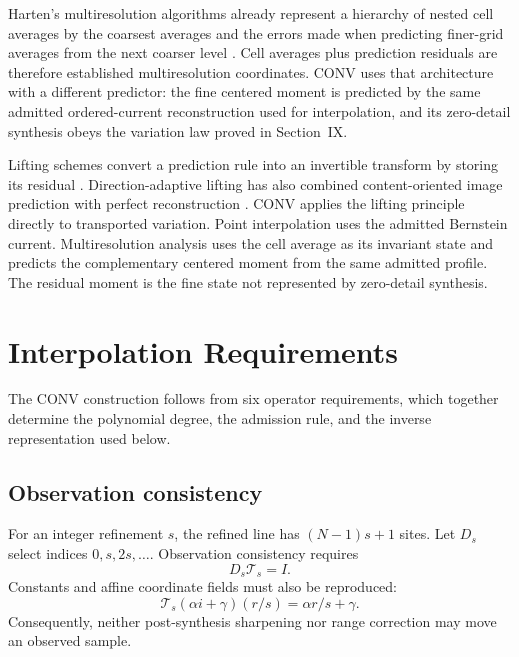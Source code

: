 \documentclass[journal]{IEEEtran}
\newcommand{\Tcal}{\mathcal{T}}
\begin{document}
Harten's multiresolution algorithms already represent a hierarchy of nested
cell averages by the coarsest averages and the errors made when predicting
finer-grid averages from the next coarser level \cite{harten1995}. Cell
averages plus prediction residuals are therefore established multiresolution
coordinates. CONV uses that architecture with a different predictor: the
fine centered moment is predicted by the same admitted ordered-current
reconstruction used for interpolation, and its zero-detail synthesis obeys
the variation law proved in Section~IX.

Lifting schemes convert a prediction rule into an invertible transform by
storing its residual \cite{sweldens1998}. Direction-adaptive lifting has also
combined content-oriented image prediction with perfect reconstruction
\cite{ding2007}. CONV applies the lifting principle directly to transported
variation. Point interpolation uses the admitted Bernstein current.
Multiresolution analysis uses the cell average as its invariant state and
predicts the complementary centered moment from the same admitted profile.
The residual moment is the fine state not represented by zero-detail
synthesis.

\section{Interpolation Requirements}

The CONV construction follows from six operator requirements, which together
determine the polynomial degree, the admission rule, and the inverse
representation used below.

\subsection{Observation consistency}

For an integer refinement \(s\), the refined line has
\((N-1)s+1\) sites. Let \(D_s\) select indices \(0,s,2s,\ldots\).
Observation consistency requires
\begin{equation}
 D_s\Tcal_s=I.
 \label{eq:reqcardinal}
\end{equation}
Constants and affine coordinate fields must also be reproduced:
\begin{equation}
 \Tcal_s(\alpha i+\gamma)(r/s)=\alpha r/s+\gamma.
 \label{eq:reqaffine}
\end{equation}
Consequently, neither post-synthesis sharpening nor range correction may move
an observed sample.
\end{document}
